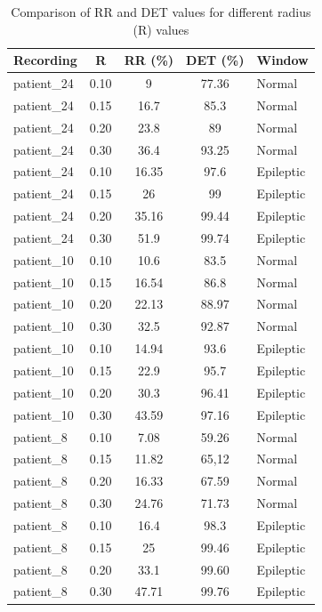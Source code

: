 \documentclass{article}
\begin{document}
				\begin{table}[h!]
				\centering
				\caption{Comparison of RR and DET values for different radius (R) values}
				\begin{tabular}{l S[table-format=1.2] S[table-format=2.2] S[table-format=2.2] l}
				\toprule
				\textbf{Recording} & \textbf{R} & \textbf{RR (\%)} & \textbf{DET (\%)} & \textbf{Window} \\
				\midrule
				patient\_24 & 0.10 & 9 & 77.36 & Normal \\
				patient\_24 & 0.15 & 16.7 & 85.3 & Normal \\
				patient\_24 & 0.20 & 23.8 & 89 & Normal \\
				patient\_24 & 0.30 & 36.4 & 93.25 & Normal \\
				patient\_24 & 0.10 & 16.35 & 97.6 & Epileptic \\
				patient\_24 & 0.15 & 26 & 99 & Epileptic \\
				patient\_24 & 0.20 & 35.16 & 99.44 & Epileptic \\
				patient\_24 & 0.30 & 51.9 & 99.74 & Epileptic \\
				\midrule
				patient\_10 & 0.10 & 10.6 & 83.5 & Normal \\
				patient\_10 & 0.15 & 16.54 & 86.8 & Normal \\
				patient\_10 & 0.20 & 22.13 & 88.97 & Normal \\
				patient\_10 & 0.30 & 32.5 & 92.87 & Normal \\
				patient\_10 & 0.10 & 14.94 & 93.6 & Epileptic \\
				patient\_10 & 0.15 & 22.9 & 95.7 & Epileptic \\
				patient\_10 & 0.20 & 30.3 & 96.41 & Epileptic \\
				patient\_10 & 0.30 & 43.59 & 97.16 & Epileptic \\
				\midrule
				patient\_8 & 0.10 & 7.08 & 59.26 & Normal \\
				patient\_8 & 0.15 & 11.82 & 65,12 & Normal \\
				patient\_8 & 0.20 & 16.33 & 67.59 & Normal \\
				patient\_8 & 0.30 & 24.76 & 71.73 & Normal \\
				patient\_8 & 0.10 & 16.4 & 98.3 & Epileptic \\
				patient\_8 & 0.15 & 25 & 99.46 & Epileptic \\
				patient\_8 & 0.20 & 33.1 & 99.60 & Epileptic \\
				patient\_8 & 0.30 & 47.71 & 99.76 & Epileptic \\

\end{tabular}
\end{table}
\end{document}
